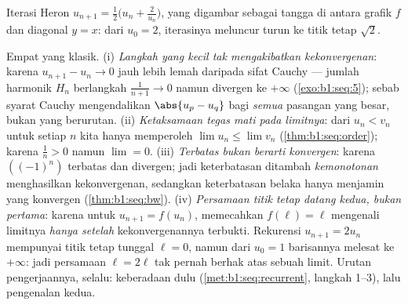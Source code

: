 \begin{omfigure}

{\small Iterasi Heron $u_{n+1} = \frac12\bigl(u_n +
\frac{2}{u_n}\bigr)$, yang digambar sebagai tangga di antara grafik $f$
dan diagonal $y = x$: dari $u_0 = 2$, iterasinya meluncur turun ke
titik tetap $\sqrt 2$.}
\end{omfigure}

\begin{remark}
Empat yang klasik. (i) \emph{Langkah yang kecil tak mengakibatkan kekonvergenan}:
karena $u_{n+1} - u_n \to 0$ jauh lebih lemah daripada sifat Cauchy ---
jumlah harmonik $H_n$ berlangkah $\frac{1}{n+1} \to 0$ namun
divergen ke $+\infty$ (\cref{exo:b1:seq:5}); sebab syarat Cauchy
mengendalikan $\abs{u_p - u_q}$ bagi \emph{semua} pasangan yang besar, bukan
yang berurutan. (ii) \emph{Ketaksamaan tegas mati pada
limitnya}: dari $u_n < v_n$ untuk setiap $n$ kita hanya memperoleh $\lim u_n
\leq \lim v_n$ (\cref{thm:b1:seq:order}); karena $\frac1n > 0$ namun
$\lim = 0$. (iii) \emph{Terbatas bukan berarti konvergen}: karena $((-1)^n)$
terbatas dan divergen; jadi keterbatasan ditambah \emph{kemonotonan}
menghasilkan kekonvergenan, sedangkan keterbatasan belaka hanya menjamin 
yang konvergen (\cref{thm:b1:seq:bw}). (iv) \emph{Persamaan titik
tetap datang kedua, bukan pertama}: karena untuk $u_{n+1} = f(u_n)$,
memecahkan $f(\ell) = \ell$ mengenali limitnya \emph{hanya setelah}
kekonvergenannya terbukti. Rekurensi $u_{n+1} = 2u_n$ mempunyai
titik tetap tunggal $\ell = 0$, namun dari $u_0 = 1$ barisannya
melesat ke $+\infty$: jadi persamaan $\ell = 2\ell$ tak pernah
berhak atas sebuah limit. Urutan pengerjaannya, selalu: keberadaan
dulu (\cref{met:b1:seq:recurrent}, langkah 1--3), lalu pengenalan
kedua.
\end{remark}

